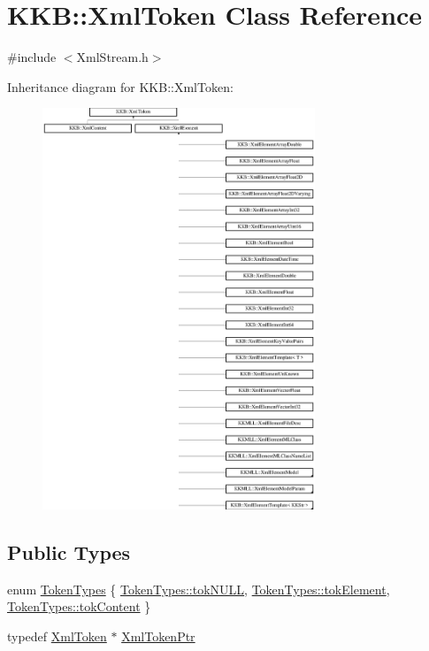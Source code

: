 \hypertarget{class_k_k_b_1_1_xml_token}{}\section{K\+KB\+:\+:Xml\+Token Class Reference}
\label{class_k_k_b_1_1_xml_token}


{\ttfamily \#include $<$Xml\+Stream.\+h$>$}

Inheritance diagram for K\+KB\+:\+:Xml\+Token\+:\begin{figure}[H]
\begin{center}
\leavevmode
\includegraphics[height=12.000000cm]{class_k_k_b_1_1_xml_token}
\end{center}
\end{figure}
\subsection*{Public Types}
\begin{DoxyCompactItemize}
\item 
enum \hyperlink{class_k_k_b_1_1_xml_token_a18b6e90c919f4b92e3b024f50f247f62}{Token\+Types} \{ \hyperlink{class_k_k_b_1_1_xml_token_a18b6e90c919f4b92e3b024f50f247f62ac2b928ae312c57a4907c1082c3058e27}{Token\+Types\+::tok\+N\+U\+LL}, 
\hyperlink{class_k_k_b_1_1_xml_token_a18b6e90c919f4b92e3b024f50f247f62a4d464d022cf7f60dae56d13300aa0312}{Token\+Types\+::tok\+Element}, 
\hyperlink{class_k_k_b_1_1_xml_token_a18b6e90c919f4b92e3b024f50f247f62aff369b5479984ca659548f37ad4caec9}{Token\+Types\+::tok\+Content}
 \}
\item 
typedef \hyperlink{class_k_k_b_1_1_xml_token}{Xml\+Token} $\ast$ \hyperlink{class_k_k_b_1_1_xml_token_a2379a40d8ebd64e9125cf68e34da13ab}{Xml\+Token\+Ptr}
\end{DoxyCompactItemize}
